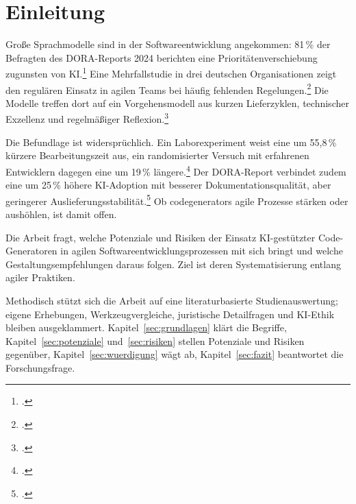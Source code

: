 \section{Einleitung}\label{sec:einleitung}

%

Große Sprachmodelle sind in der Softwareentwicklung angekommen: 81\,\% der Befragten des \acs{DORA}-Reports 2024 berichten eine Prioritätenverschiebung zugunsten von \acs{KI}.\footcite[\vglf][]{DORA.2024} Eine Mehrfallstudie in drei deutschen Organisationen zeigt den regulären Einsatz in agilen Teams bei häufig fehlenden Regelungen.\footcite[\vglf][ f.]{Neumann.2026} Die Modelle treffen dort auf ein Vorgehensmodell aus kurzen Lieferzyklen, technischer Exzellenz und regelmäßiger Reflexion.\footcite[\vglf][o.\,S.]{Beck.2001}

Die Befundlage ist widersprüchlich. Ein Laborexperiment weist eine um 55,8\,\% kürzere Bearbeitungszeit aus, ein randomisierter Versuch mit erfahrenen Entwicklern dagegen eine um 19\,\% längere.\footcites(\vglf)()[][]{Peng.2023}[][]{Becker.2025} Der DORA-Report verbindet zudem eine um 25\,\% höhere KI-Adoption mit besserer Dokumentationsqualität, aber geringerer Auslieferungsstabilität.\footcite[\vglf][, ]{DORA.2024} Ob \glspl{codegenerator} agile Prozesse stärken oder aushöhlen, ist damit offen.

Die Arbeit fragt, welche Potenziale und Risiken der Einsatz KI-gestützter Code-Generatoren in agilen Softwareentwicklungsprozessen mit sich bringt und welche Gestaltungsempfehlungen daraus folgen. Ziel ist deren Systematisierung entlang agiler Praktiken.

Methodisch stützt sich die Arbeit auf eine literaturbasierte Studienauswertung; eigene Erhebungen, Werkzeugvergleiche, juristische Detailfragen und KI-Ethik bleiben ausgeklammert. Kapitel~\ref{sec:grundlagen} klärt die Begriffe, Kapitel~\ref{sec:potenziale} und~\ref{sec:risiken} stellen Potenziale und Risiken gegenüber, Kapitel~\ref{sec:wuerdigung} wägt ab, Kapitel~\ref{sec:fazit} beantwortet die Forschungsfrage.
